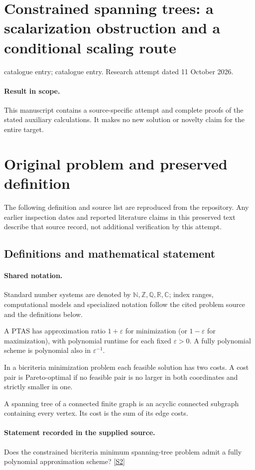 \documentclass[11pt]{article}
\begin{document}
\section*{Constrained spanning trees: a scalarization obstruction and a conditional scaling route}
\noindent catalogue entry; catalogue entry. Research attempt dated 11 October 2026.
\paragraph{Result in scope.}This manuscript contains a source-specific attempt and complete proofs of the stated auxiliary calculations. It makes no new solution or novelty claim for the entire target.
\section{Original problem and preserved definition}
The following definition and source list are reproduced from the repository. Any earlier inspection dates and reported literature claims in this preserved text describe that source record, not additional verification by this attempt.
\subsection{Definitions and mathematical statement}

\paragraph{Shared notation.}Standard number systems are denoted by $\mathbb N,\mathbb Z,\mathbb Q,\mathbb R,\mathbb C$; index ranges, computational models and specialized notation follow the cited problem source and the definitions below.


A PTAS has approximation ratio $1+\varepsilon$ for minimization (or $1-\varepsilon$ for maximization), with polynomial runtime for each fixed $\varepsilon>0$. A fully polynomial scheme is polynomial also in $\varepsilon^{-1}$.

In a bicriteria minimization problem each feasible solution has two costs. A cost pair is Pareto-optimal if no feasible pair is no larger in both coordinates and strictly smaller in one.

A spanning tree of a connected finite graph is an acyclic connected subgraph containing every vertex. Its cost is the sum of its edge costs.
\paragraph{Statement recorded in the supplied source.}
Does the constrained bicriteria minimum spanning-tree problem admit a fully polynomial approximation scheme? \href{https://doi.org/10.4171/owr/2004/28}{[S2]}
\end{document}
